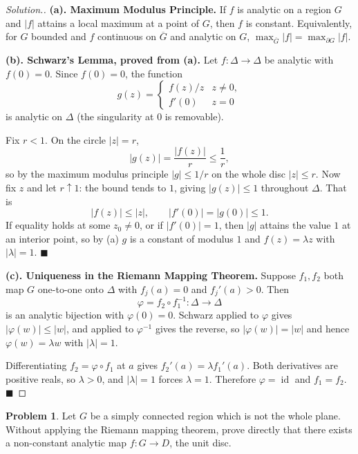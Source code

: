 \documentclass[11pt,a4paper]{article}
\theoremstyle{definition}
\newtheorem{problemx}{Problem}[section]
\newenvironment{problem}{\begin{problemx}}{\end{problemx}}
\newenvironment{solution}
  {\renewcommand{\qedsymbol}{}\begin{proof}[\textit{Solution}.]}
  {\end{proof}}
\begin{document}
\begin{solution}
\textbf{(a). Maximum Modulus Principle.} If $f$ is analytic on a region $G$ and
$\left|f\right|$ attains a local maximum at a point of $G$, then $f$ is constant.
Equivalently, for $G$ bounded and $f$ continuous on $\overline{G}$ and analytic on
$G$, $\max_{\overline{G}}\left|f\right| = \max_{\partial G}\left|f\right|$.

\textbf{(b). Schwarz's Lemma, proved from (a).} Let $f : \Delta \rightarrow \Delta$
be analytic with $f(0) = 0$. Since $f(0) = 0$, the function
$$g(z) = \begin{cases} f(z)/z & z \neq 0,\\ f'(0) & z = 0\end{cases}$$
is analytic on $\Delta$ (the singularity at $0$ is removable).

Fix $r < 1$. On the circle $\left|z\right| = r$,
$$\left|g(z)\right| = \frac{\left|f(z)\right|}{r} \leq \frac{1}{r},$$
so by the maximum modulus principle $\left|g\right| \leq 1/r$ on the whole disc
$\left|z\right| \leq r$. Now fix $z$ and let $r \uparrow 1$: the bound tends to
$1$, giving $\left|g(z)\right| \leq 1$ throughout $\Delta$. That is
$$\left|f(z)\right| \leq \left|z\right|,\qquad \left|f'(0)\right| = \left|g(0)\right| \leq 1 .$$
If equality holds at some $z_0 \neq 0$, or if $\left|f'(0)\right| = 1$, then
$\left|g\right|$ attains the value $1$ at an interior point, so by (a) $g$ is a
constant of modulus $1$ and $f(z) = \lambda z$ with $\left|\lambda\right| = 1$.
$\blacksquare$

\textbf{(c). Uniqueness in the Riemann Mapping Theorem.} Suppose $f_1, f_2$ both
map $G$ one-to-one onto $\Delta$ with $f_j(a) = 0$ and $f_j'(a) > 0$. Then
$$\varphi = f_2 \circ f_1^{-1} : \Delta \rightarrow \Delta$$
is an analytic bijection with $\varphi(0) = 0$. Schwarz applied to $\varphi$ gives
$\left|\varphi(w)\right| \leq \left|w\right|$, and applied to $\varphi^{-1}$ gives
the reverse, so $\left|\varphi(w)\right| = \left|w\right|$ and hence
$\varphi(w) = \lambda w$ with $\left|\lambda\right| = 1$.

Differentiating $f_2 = \varphi \circ f_1$ at $a$ gives
$f_2'(a) = \lambda f_1'(a)$. Both derivatives are positive reals, so
$\lambda > 0$, and $\left|\lambda\right| = 1$ forces $\lambda = 1$. Therefore
$\varphi = \operatorname{id}$ and $f_1 = f_2$. $\blacksquare$
\end{solution}


\begin{problem}
Let $G$ be a simply connected region which is not the whole plane. Without
applying the Riemann mapping theorem, prove directly that there exists a
non-constant analytic map $f : G \rightarrow D$, the unit disc.
\end{problem}
\end{document}
